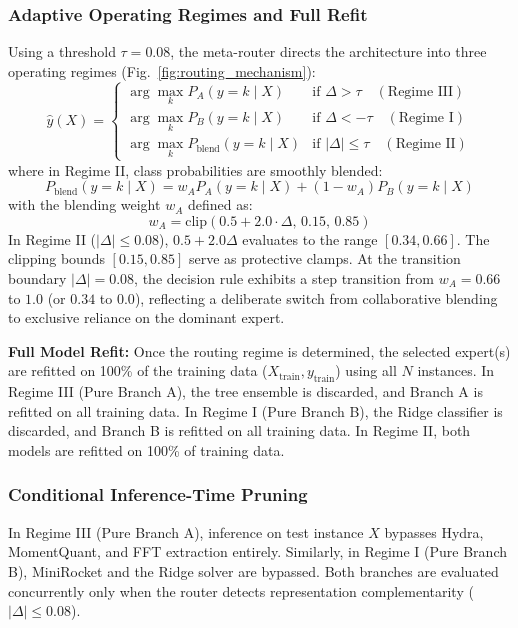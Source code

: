 \documentclass[journal,twocolumn]{article}
\begin{document}
\subsubsection{Adaptive Operating Regimes and Full Refit}
Using a threshold $\tau = 0.08$, the meta-router directs the architecture into three operating regimes (Fig.~\ref{fig:routing_mechanism}):
\begin{equation}
    \hat{y}(X) = 
    \begin{cases}
        \arg\max_k P_A(y = k \mid X) & \text{if } \Delta > \tau \quad (\text{Regime III}) \\
        \arg\max_k P_B(y = k \mid X) & \text{if } \Delta < -\tau \quad (\text{Regime I}) \\
        \arg\max_k P_{\text{blend}}(y = k \mid X) & \text{if } |\Delta| \le \tau \quad (\text{Regime II})
    \end{cases}
    \label{eq:routing_rule}
\end{equation}
where in Regime II, class probabilities are smoothly blended:
\begin{equation}
    P_{\text{blend}}(y = k \mid X) = w_A P_A(y = k \mid X) + (1 - w_A) P_B(y = k \mid X)
    \label{eq:soft_blend}
\end{equation}
with the blending weight $w_A$ defined as:
\begin{equation}
    w_A = \text{clip}(0.5 + 2.0 \cdot \Delta, \, 0.15, \, 0.85)
    \label{eq:weight_clip}
\end{equation}
In Regime II ($|\Delta| \le 0.08$), $0.5 + 2.0\Delta$ evaluates to the range $[0.34, 0.66]$. The clipping bounds $[0.15, 0.85]$ serve as protective clamps. At the transition boundary $|\Delta| = 0.08$, the decision rule exhibits a step transition from $w_A = 0.66$ to $1.0$ (or $0.34$ to $0.0$), reflecting a deliberate switch from collaborative blending to exclusive reliance on the dominant expert.

\textbf{Full Model Refit:} Once the routing regime is determined, the selected expert(s) are refitted on 100\% of the training data ($X_{\text{train}}, y_{\text{train}}$) using all $N$ instances. In Regime III (Pure Branch A), the tree ensemble is discarded, and Branch A is refitted on all training data. In Regime I (Pure Branch B), the Ridge classifier is discarded, and Branch B is refitted on all training data. In Regime II, both models are refitted on 100\% of training data.

\subsubsection{Conditional Inference-Time Pruning}
In Regime III (Pure Branch A), inference on test instance $X$ bypasses Hydra, MomentQuant, and FFT extraction entirely. Similarly, in Regime I (Pure Branch B), MiniRocket and the Ridge solver are bypassed. Both branches are evaluated concurrently only when the router detects representation complementarity ($|\Delta| \le 0.08$).
\end{document}
